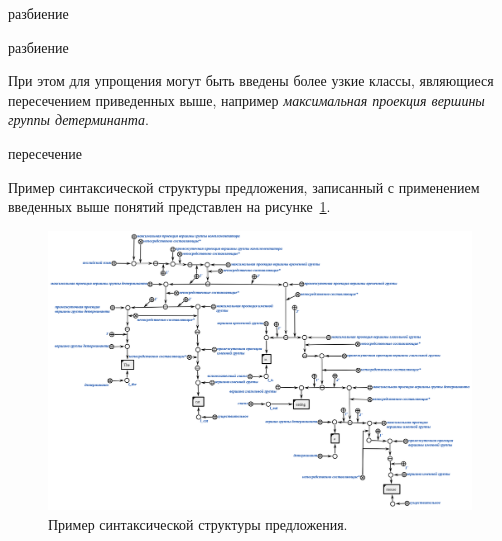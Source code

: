 \begin{SCn}
\begin{scnrelfromset}{разбиение}
\begin{scnindent}
        \end{scnindent}
        \begin{scnindent}
        \end{scnindent}
    \end{scnrelfromset}
    \begin{scnrelfromset}{разбиение}
    \end{scnrelfromset}

\end{SCn}

При этом для упрощения могут быть введены более узкие классы, являющиеся пересечением приведенных выше, например \textit{максимальная проекция вершины группы детерминанта}.

\begin{SCn}

    \begin{scnreltoset}{пересечение}
    \end{scnreltoset}

\end{SCn}

Пример синтаксической структуры предложения, записанный с применением введенных выше понятий представлен на рисунке~\ref{pic_tree}.

\begin{figure}[h]
    \centering
    \includegraphics[width=\textwidth]{images/part2/chapter_lang/syntactic.png}
    \caption{Пример синтаксической структуры предложения.}
    \label{pic_tree}
\end{figure}

